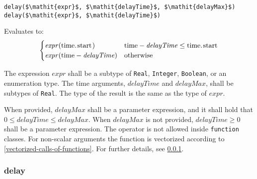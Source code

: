 \begin{operatordefinition}[delay]
\begin{synopsis}\begin{lstlisting}
delay($\mathit{expr}$, $\mathit{delayTime}$, $\mathit{delayMax}$)
delay($\mathit{expr}$, $\mathit{delayTime}$)
\end{lstlisting}\end{synopsis}
\begin{semantics}
Evaluates to:
\begin{equation*}
\begin{cases}
\mathit{expr}(\text{\lstinline!time.start!}) & \text{\lstinline!time!} - \mathit{delayTime} \leq \text{\lstinline!time.start!}\\
\mathit{expr}(\text{\lstinline!time!} - \mathit{delayTime}) & \text{otherwise}
\end{cases}
\end{equation*}

The expression $\mathit{expr}$ shall be a subtype of \lstinline!Real!, \lstinline!Integer!, \lstinline!Boolean!, or an enumeration type.
The time arguments, $\mathit{delayTime}$ and $\mathit{delayMax}$, shall be subtypes of \lstinline!Real!.
The type of the result is the same as the type of $\mathit{expr}$.

When provided, $\mathit{delayMax}$ shall be a parameter expression, and it shall hold that $0 \leq \mathit{delayTime} \leq \mathit{delayMax}$.
When $\mathit{delayMax}$ is not provided, $\mathit{delayTime} \geq 0$ shall be a parameter expression.
The operator is not allowed inside \lstinline!function! classes.
For non-scalar arguments the function is vectorized according to \cref{vectorized-calls-of-functions}.
For further details, see \cref{delay}.
\end{semantics}
\end{operatordefinition}


\subsubsection{delay}\label{delay}

